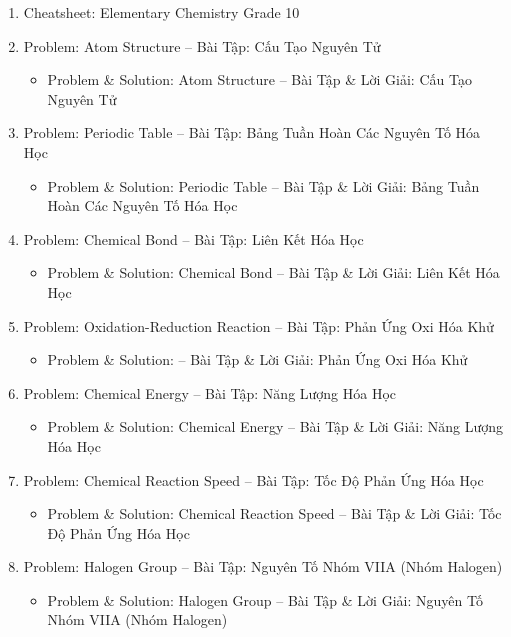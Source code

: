 \documentclass[12pt,twoside]{book}
\begin{document}
\begin{enumerate}
	\item Cheatsheet: Elementary Chemistry Grade 10
	\item Problem: Atom Structure -- Bài Tập: Cấu Tạo Nguyên Tử
	\begin{itemize}
		\item Problem \& Solution: Atom Structure -- Bài Tập \& Lời Giải: Cấu Tạo Nguyên Tử
	\end{itemize}
	\item Problem: Periodic Table -- Bài Tập: Bảng Tuần Hoàn Các Nguyên Tố Hóa Học
	\begin{itemize}
		\item Problem \& Solution: Periodic Table -- Bài Tập \& Lời Giải: Bảng Tuần Hoàn Các Nguyên Tố Hóa Học
	\end{itemize}
	\item Problem: Chemical Bond -- Bài Tập: Liên Kết Hóa Học
	\begin{itemize}
		\item Problem \& Solution: Chemical Bond -- Bài Tập \& Lời Giải: Liên Kết Hóa Học
	\end{itemize}
	\item Problem: Oxidation-Reduction Reaction -- Bài Tập: Phản Ứng Oxi Hóa Khử
	\begin{itemize}
		\item Problem \& Solution: -- Bài Tập \& Lời Giải: Phản Ứng Oxi Hóa Khử
	\end{itemize}
	\item Problem: Chemical Energy -- Bài Tập: Năng Lượng Hóa Học
	\begin{itemize}
		\item Problem \& Solution: Chemical Energy -- Bài Tập \& Lời Giải: Năng Lượng Hóa Học
	\end{itemize}
	\item Problem: Chemical Reaction Speed -- Bài Tập: Tốc Độ Phản Ứng Hóa Học
	\begin{itemize}
		\item Problem \& Solution: Chemical Reaction Speed -- Bài Tập \& Lời Giải: Tốc Độ Phản Ứng Hóa Học
	\end{itemize}
	\item Problem: Halogen Group -- Bài Tập: Nguyên Tố Nhóm VIIA (Nhóm Halogen)
	\begin{itemize}
		\item Problem \& Solution: Halogen Group -- Bài Tập \& Lời Giải: Nguyên Tố Nhóm VIIA (Nhóm Halogen)
	\end{itemize}
\end{enumerate}
\end{document}
